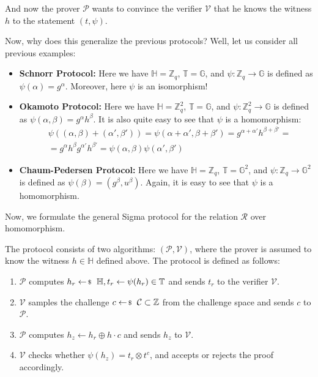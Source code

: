 \documentclass[../lecture-notes-148x210.tex]{subfiles}
\begin{document}
And now the prover $\mathcal{P}$ wants to convince the verifier $\mathcal{V}$ that he knows the witness $h$ to the statement $(t,\psi)$. 
\begin{proposition}
    Now, why does this generalize the previous protocols? Well, let us consider all previous examples:
    \begin{itemize}
        \item \textbf{Schnorr Protocol:} Here we have $\mathbb{H} = \mathbb{Z}_q$, $\mathbb{T} = \mathbb{G}$, and $\psi: \mathbb{Z}_q \to \mathbb{G}$ is defined as $\psi(\alpha) = g^{\alpha}$. Moreover, here $\psi$ is an isomorphism!
        \item \textbf{Okamoto Protocol:} Here we have $\mathbb{H} = \mathbb{Z}_q^2$, $\mathbb{T} = \mathbb{G}$, and $\psi: \mathbb{Z}_q^2 \to \mathbb{G}$ is defined as $\psi(\alpha,\beta) = g^{\alpha}h^{\beta}$. It is also quite easy to see that $\psi$ is a homomorphism:
        \begin{equation*}
            \begin{aligned}
                &\psi((\alpha,\beta) + (\alpha',\beta')) = \psi(\alpha+\alpha',\beta+\beta') = g^{\alpha+\alpha'}h^{\beta+\beta'} = \\ 
                &= g^{\alpha}h^{\beta}g^{\alpha'}h^{\beta'} = \psi(\alpha,\beta)\psi(\alpha',\beta')                
            \end{aligned}
        \end{equation*}
        \item \textbf{Chaum-Pedersen Protocol:} Here we have $\mathbb{H} = \mathbb{Z}_q$, $\mathbb{T} = \mathbb{G}^2$, and $\psi: \mathbb{Z}_q \to \mathbb{G}^2$ is defined as $\psi(\beta) = (g^{\beta},u^{\beta})$. Again, it is easy to see that $\psi$ is a homomorphism.
    \end{itemize}
\end{proposition}

Now, we formulate the general Sigma protocol for the relation $\mathcal{R}$ over homomorphism.

\begin{definition}
    The protocol consists of two algorithms: $(\mathcal{P}, \mathcal{V})$, where the prover is assumed to know the witness $h \in \mathbb{H}$ defined above. The protocol is defined as follows:
    \begin{enumerate}
        \item $\mathcal{P}$ computes $h_r \leftarrowS \mathbb{H}, t_r \gets \psi(h_r) \in \mathbb{T}$ and sends $t_r$ to the verifier $\mathcal{V}$.
        \item $\mathcal{V}$ samples the challenge $c \leftarrowS \mathcal{C} \subset \mathbb{Z}$ from the challenge space and sends $c$ to $\mathcal{P}$.
        \item $\mathcal{P}$ computes $h_z \gets h_r \oplus h\cdot c$ and sends $h_z$ to $\mathcal{V}$.
        \item $\mathcal{V}$ checks whether $\psi(h_z) = t_r \otimes t^c$, and accepts or rejects the proof accordingly.
    \end{enumerate}
\end{definition}
\end{document}
